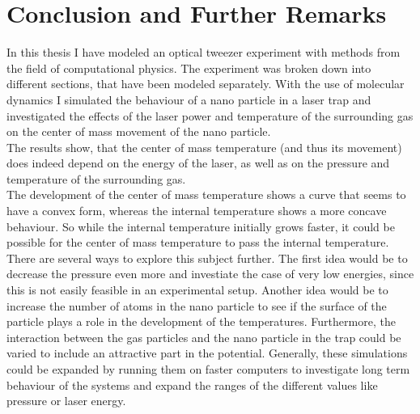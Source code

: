 \documentclass[12pt]{article}
\begin{document}
\newpage
\section{Conclusion and Further Remarks}
In this thesis I have modeled an optical tweezer experiment with methods from the field of computational physics. The experiment was broken down into
different sections, that have been modeled separately. With the use of molecular dynamics I simulated the behaviour of a nano particle in a laser trap
and investigated the effects of the laser power and temperature of the surrounding gas on the center of mass movement of the nano particle.\\
The results show, that the center of mass temperature (and thus its movement) does indeed depend on the energy of the laser, as well as on the
pressure and temperature of the surrounding gas.\\
The development of the center of mass temperature shows a curve that seems to have a convex form, whereas the internal temperature shows a more
concave behaviour. So while the internal temperature initially grows faster, it could be possible for the center of mass temperature to pass the
internal temperature.\\
There are several ways to explore this subject further. The first idea would be to decrease the pressure even more and investiate the case of very low
energies, since this is not easily feasible in an experimental setup. Another idea would be to increase the number of atoms in the nano particle to
see if the surface of the particle plays a role in the development of the temperatures. Furthermore, the interaction between the gas particles and the
nano particle in the trap could be varied to include an attractive part in the potential. Generally, these simulations could be expanded by running
them on faster computers to investigate long term behaviour of the systems and expand the ranges of the different values like pressure or laser
energy. 




\newpage


\end{document}
